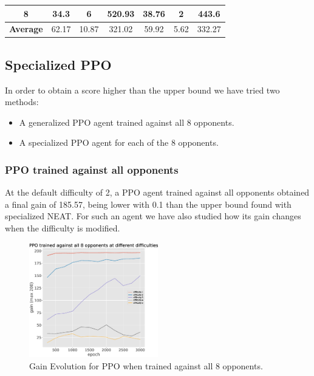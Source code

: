 \documentclass[conference]{IEEEtran}
\begin{document}
\begin{table}[htbp]
\begin{center}
\begin{tabular}{|c|c|c|c|c|c|c|}
                8                & 34.3                              & 6                                & 520.93                         & 38.76                             & 2                                & 443.6                          \\
                \hline
                \textbf{Average} & 62.17                             & 10.87                            & 321.02                         & 59.92                             & 5.62                             & 332.27                         \\
            \end{tabular}
        \end{center}
    \end{table}

    \subsection{Specialized PPO}\label{subsec:specialized-ppo}
    In order to obtain a score higher than the upper bound we have tried two methods:
    \begin{itemize}
        \item A generalized PPO agent trained against all $8$ opponents.
        \item A specialized PPO agent for each of the $8$ opponents.
    \end{itemize}

    \subsubsection{PPO trained against all opponents}
    At the default difficulty of 2, a PPO agent trained against all opponents
    obtained a final gain of 185.57, being lower with 0.1 than the
    upper bound found with specialized NEAT\@.
    For such an agent we have also studied how its gain changes when the difficulty
    is modified.
    \begin{figure}[htbp]
        \centering
        \includegraphics[width=0.5\textwidth]{images/general_harmonic_gain.eps}
        \caption{Gain Evolution for PPO when trained against all 8 opponents.}
        \label{fig:ppo_train_8}
    \end{figure}
\end{document}
